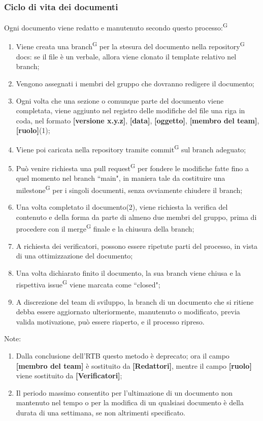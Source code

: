 \documentclass[8pt]{article}
\newcommand{\glossterm}[1]{#1\textsuperscript{G}} %
\begin{document}
\subsubsection{Ciclo di vita dei documenti}
Ogni documento viene redatto e manutenuto secondo questo \glossterm{processo:}
\begin{enumerate}
    \item Viene creata una \glossterm{branch} per la stesura del documento nella \glossterm{repository} docs: se il file è un verbale, allora viene clonato il template relativo nel branch;
    \item Vengono assegnati i membri del gruppo che dovranno redigere il documento; 
    \item Ogni volta che una sezione o comunque parte del documento viene completata, viene aggiunto
        nel registro delle modifiche del file una riga in coda, nel formato \textbf{[versione
        x.y.z]}, \textbf{[data]}, \textbf{[oggetto]}, \textbf{[membro del team]}, \textbf{[ruolo]}(1);  
    \item Viene poi caricata nella repository tramite \glossterm{commit} sul branch adeguato;
    \item Può venire richiesta una \glossterm{pull request} per fondere le modifiche fatte fino a quel momento
        nel branch ``main", in maniera tale da costituire una \glossterm{milestone} per i singoli documenti, senza ovviamente chiudere il branch;
    \item Una volta completato il documento(2), viene richiesta la verifica del contenuto e della forma
        da parte di almeno due membri del gruppo, prima di procedere con il \glossterm{merge} finale e la chiusura della branch; 
    \item A richiesta dei verificatori, possono essere ripetute parti del processo, in vista di una ottimizzazione del documento;
    \item Una volta dichiarato finito il documento, la sua branch viene chiusa e la rispettiva \glossterm{issue} viene marcata come ``closed";
    \item A discrezione del team di sviluppo, la branch di un documento che si ritiene debba essere aggiornato ulteriormente, manutenuto o modificato, previa valida motivazione, può essere riaperto, e il processo ripreso. 
\end{enumerate}
Note: \\
\begin{enumerate}
    \item Dalla conclusione dell'RTB questo metodo è deprecato; ora il campo \textbf{[membro del team]} è sostituito da \textbf{[Redattori]}, mentre il campo \textbf{[ruolo]} viene sostituito da \textbf{[Verificatori]};
    \item Il periodo massimo consentito per l'ultimazione di un documento non mantenuto nel tempo o per la modifica di un qualsiasi documento è della durata di una settimana, se non altrimenti specificato.
\end{enumerate}
\end{document}
